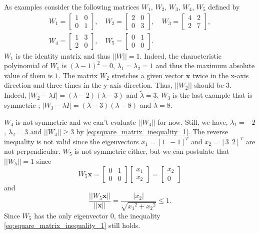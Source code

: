 \documentclass[12pt]{report}
\numberwithin{figure}{chapter}
\theoremstyle{plain}
\theoremstyle{definition}
\theoremstyle{corollary}
\theoremstyle{definition}
\theoremstyle{plain}
\theoremstyle{definition}
\theoremstyle{plain}
\newcommand\bx{\ensuremath{\boldsymbol x}}
\begin{document}
As examples consider the following matrices \(W_1\), \(W_2\), \(W_3\), \(W_4\), \(W_5\) defined by
\begin{gather*}
W_1=\begin{bmatrix}
1&0\\0&1
\end{bmatrix},\quad
W_2=\begin{bmatrix}
2&0\\0&3
\end{bmatrix},\quad
W_3=\begin{bmatrix}
4&2\\2&7
\end{bmatrix},\\
W_4=\begin{bmatrix}
1&3\\2&0
\end{bmatrix},\quad
W_5=\begin{bmatrix}
0&1\\0&0
\end{bmatrix}.\quad
\end{gather*}
\(W_1\) is the identity matrix and thus \(||W||=1\).
Indeed, the characteristic polyinomial of \(W_1\) is \((\lambda-1)^2=0\), \(\lambda_1=\lambda_2=1\) and thus the maximum absolute value of them is \(1\).
The matrix \(W_2\) stretches a given vector \(\bx\) twice in the x-axis direction and three times in the y-axis direction.
Thus, \(||W_2||\) should be \(3\).
Indeed, \(|W_2-\lambda I|=(\lambda-2)(\lambda-3)\) and \(\tilde\lambda=3\).
\(W_3\) is the last example that is symmetric ; \(|W_3-\lambda I|=(\lambda-3)(\lambda-8)\) and \(\tilde\lambda=8\).

\(W_4\) is not symmetric and we can't evaluate \(||W_4||\) for now.
Still, we have, \(\lambda_1=-2\), \(\lambda_2=3\) and \(||W_4||\ge3\) by \eqref{eq:square_matrix_inequality_1}.
The reverse inequality is not valid since the eigenvectors \(x_1=[1\:\:-1]^T\) and \(x_2=[3\:\:2]^T\) are not perpendicular.
\(W_5\) is not symmetric either, but we can postulate that \(||W_5||=1\) since
\[
W_5\bx=
\begin{bmatrix}
0&1\\0&0
\end{bmatrix}
\begin{bmatrix}
x_1\\x_2
\end{bmatrix}
=
\begin{bmatrix}
x_2\\0
\end{bmatrix}
\]
and
\[
\frac{||W_5\bx||}{||\bx||}=\frac{|x_2|}{\sqrt{{x_1}^2+{x_2}^2}}\le 1.
\]
Since \(W_5\) has the only eigenvector \(0\), the inequality \eqref{eq:square_matrix_inequality_1} still holds.
\end{document}

